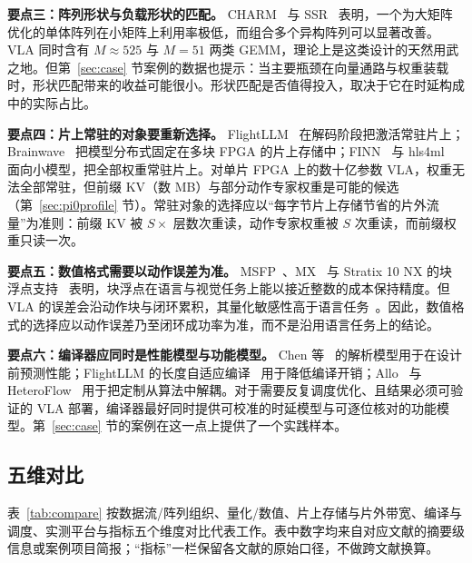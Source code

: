 \documentclass[a4paper,10.5pt]{ctexart}
\begin{document}
\textbf{要点三：阵列形状与负载形状的匹配。} CHARM~\cite{charm} 与 SSR~\cite{ssr} 表明，一个为大矩阵优化的单体阵列在小矩阵上利用率极低，而组合多个异构阵列可以显著改善。VLA 同时含有 $M\approx525$ 与 $M=51$ 两类 GEMM，理论上是这类设计的天然用武之地。但第~\ref{sec:case} 节案例的数据也提示：当主要瓶颈在向量通路与权重装载时，形状匹配带来的收益可能很小。形状匹配是否值得投入，取决于它在时延构成中的实际占比。

\textbf{要点四：片上常驻的对象要重新选择。} FlightLLM~\cite{flightllm} 在解码阶段把激活常驻片上；Brainwave~\cite{brainwave} 把模型分布式固定在多块 FPGA 的片上存储中；FINN~\cite{finn} 与 hls4ml~\cite{hls4ml} 面向小模型，把全部权重常驻片上。对单片 FPGA 上的数十亿参数 VLA，权重无法全部常驻，但前缀 KV（数 MB）与部分动作专家权重是可能的候选（第~\ref{sec:pi0profile} 节）。常驻对象的选择应以“每字节片上存储节省的片外流量”为准则：前缀 KV 被 $S\times$ 层数次重读，动作专家权重被 $S$ 次重读，而前缀权重只读一次。

\textbf{要点五：数值格式需要以动作误差为准。} MSFP~\cite{msfp}、MX~\cite{mx} 与 Stratix 10 NX 的块浮点支持~\cite{s10nx_fpga21} 表明，块浮点在语言与视觉任务上能以接近整数的成本保持精度。但 VLA 的误差会沿动作块与闭环累积，其量化敏感性高于语言任务~\cite{vlaquantbench}。因此，数值格式的选择应以动作误差乃至闭环成功率为准，而不是沿用语言任务上的结论。

\textbf{要点六：编译器应同时是性能模型与功能模型。} Chen 等~\cite{chen2024trets} 的解析模型用于在设计前预测性能；FlightLLM 的长度自适应编译~\cite{flightllm} 用于降低编译开销；Allo~\cite{allo} 与 HeteroFlow~\cite{heteroflow} 用于把定制从算法中解耦。对于需要反复调度优化、且结果必须可验证的 VLA 部署，编译器最好同时提供可校准的时延模型与可逐位核对的功能模型。第~\ref{sec:case} 节的案例在这一点上提供了一个实践样本。

\subsection{五维对比}

表~\ref{tab:compare} 按数据流/阵列组织、量化/数值、片上存储与片外带宽、编译与调度、实测平台与指标五个维度对比代表工作。表中数字均来自对应文献的摘要级信息或案例项目简报；“指标”一栏保留各文献的原始口径，不做跨文献换算。
\end{document}
